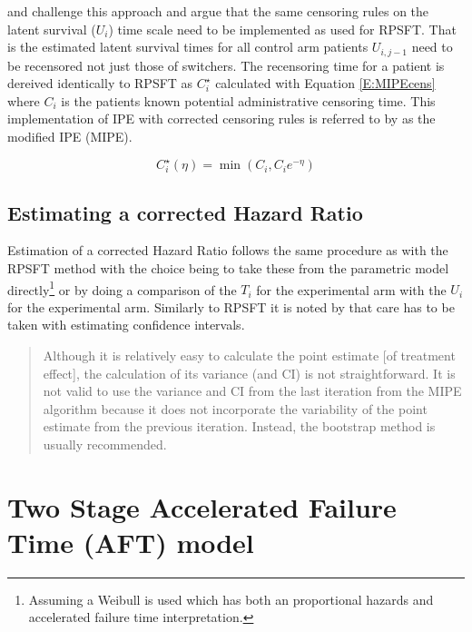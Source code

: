 \cite{White2006} and \cite{Zhang2016} challenge this approach and argue that the same censoring rules on the latent survival ($U_i$) time scale need to be implemented as used for RPSFT. That is the estimated latent survival times for all control arm patients $U_{i,j-1}$ need to be recensored not just those of switchers. The recensoring time for a patient is dereived identically to RPSFT as $C_i^\star$ calculated with Equation \ref{E:MIPEcens} where $C_i$ is the patients known potential administrative censoring time. This implementation of IPE with corrected censoring rules is referred to by \cite{Zhang2016} as the modified IPE (MIPE).

\begin{equation}
\label{E:MIPEcens}
C_i^\star(\eta) = \min \left( C_i, C_i e^{-\eta} \right)
\end{equation}

\subsection{Estimating a corrected Hazard Ratio}

Estimation of a corrected Hazard Ratio follows the same procedure as with the RPSFT method with the choice being to take these from the parametric model directly\footnote{Assuming a Weibull is used which has both an proportional hazards and accelerated failure time interpretation.} or by doing a comparison of the $T_i$ for the experimental arm with the $U_i$ for the experimental arm. Similarly to RPSFT it is noted by \cite{Zhang2016} that care has to be taken with estimating confidence intervals.
\begin{quote}
Although it is relatively easy to calculate the point estimate [of treatment effect], the calculation of its variance (and CI) is not straightforward. It is not valid to use the variance and CI from the last iteration from the MIPE algorithm because it does not incorporate the variability of the point estimate from the previous iteration. Instead, the bootstrap method is usually recommended.
\end{quote}

\section{Two Stage Accelerated Failure Time (AFT) model }

